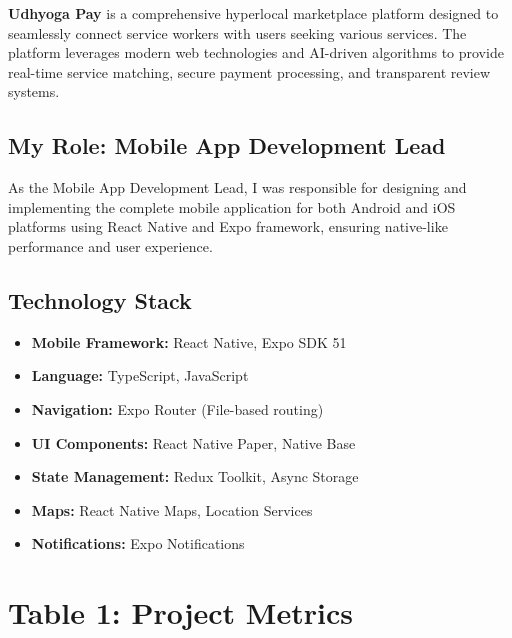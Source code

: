 \documentclass[12pt,a4paper]{article}
\begin{document}
\textbf{Udhyoga Pay} is a comprehensive hyperlocal marketplace platform designed to seamlessly connect service workers with users seeking various services. The platform leverages modern web technologies and AI-driven algorithms to provide real-time service matching, secure payment processing, and transparent review systems.

\subsection*{My Role: Mobile App Development Lead}
As the Mobile App Development Lead, I was responsible for designing and implementing the complete mobile application for both Android and iOS platforms using React Native and Expo framework, ensuring native-like performance and user experience.

\subsection*{Technology Stack}
\begin{itemize}[leftmargin=*]
    \item \textbf{Mobile Framework:} React Native, Expo SDK 51
    \item \textbf{Language:} TypeScript, JavaScript
    \item \textbf{Navigation:} Expo Router (File-based routing)
    \item \textbf{UI Components:} React Native Paper, Native Base
    \item \textbf{State Management:} Redux Toolkit, Async Storage
    \item \textbf{Maps:} React Native Maps, Location Services
    \item \textbf{Notifications:} Expo Notifications
\end{itemize}

\vspace{0.3cm}

\section*{Table 1: Project Metrics}
\end{document}
